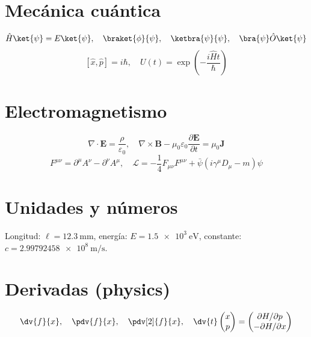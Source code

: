 
\section*{Mecánica cuántica}
\[
\hat{H}\ket{\psi} = E\ket{\psi},\quad
\braket{\phi}{\psi},\quad
\ketbra{\psi}{\psi},\quad
\bra{\psi}\hat{O}\ket{\psi}
\]
\[
\left[ \hat{x}, \hat{p} \right] = i\hbar,\quad
U(t) = \exp\!\left(-\frac{i\hat{H}t}{\hbar}\right)
\]

\section*{Electromagnetismo}
\[
\nabla\cdot\mathbf{E} = \frac{\rho}{\varepsilon_0},\quad
\nabla\times\mathbf{B} - \mu_0\varepsilon_0\frac{\partial\mathbf{E}}{\partial t} = \mu_0\mathbf{J}
\]
\[
F^{\mu\nu} = \partial^\mu A^\nu - \partial^\nu A^\mu,\quad
\mathcal{L} = -\frac{1}{4}F_{\mu\nu}F^{\mu\nu} + \bar{\psi}(i\gamma^\mu D_\mu - m)\psi
\]

\section*{Unidades y números}
Longitud: $\ell = \SI{12.3}{\milli\meter}$,
energía: $E = \SI{1.5e3}{\electronvolt}$,
constante: $c = \SI{2.99792458e8}{\meter\per\second}$.

\section*{Derivadas (physics)}
\[
\dv{f}{x},\quad
\pdv{f}{x},\quad
\pdv[2]{f}{x},\quad
\dv{t}\begin{pmatrix} x \\ p \end{pmatrix}
= \begin{pmatrix} \partial H/\partial p \\ -\partial H/\partial x \end{pmatrix}
\]
